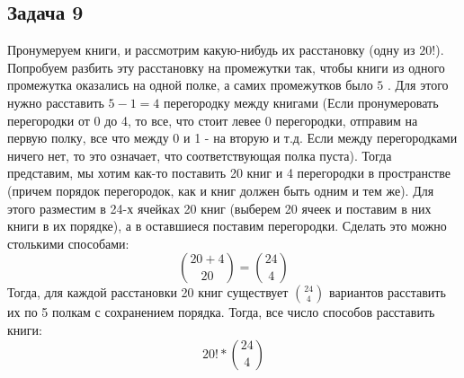 \documentclass{article}
\begin{document}
\begin{center}
	\subsection*{Задача 9}
\end{center}

Пронумеруем книги, и рассмотрим какую-нибудь их расстановку (одну из $20!$). Попробуем разбить эту расстановку на промежутки так, чтобы книги из одного промежутка оказались на одной полке, а самих промежутков было $5$ . Для этого нужно расставить $5 - 1 = 4$ перегородку между книгами  (Если пронумеровать перегородки от 0 до 4, то все, что стоит левее 0 перегородки, отправим на первую полку, все что между 0 и 1 - на вторую и т.д. Если между перегородками ничего нет, то это означает, что соответствующая полка пуста). Тогда представим, мы хотим как-то поставить 20 книг и 4 перегородки в пространстве (причем порядок перегородок, как и книг должен быть одним и тем же). Для этого разместим в 24-х ячейках 20 книг (выберем 20 ячеек и поставим в них книги в их порядке), а в оставшиеся поставим перегородки. Сделать это можно столькими способами: 
$$ {20 + 4 \choose 20} = {24 \choose 4}  $$
Тогда, для каждой расстановки 20 книг существует $ {24 \choose 4}  $ вариантов расставить их по 5 полкам с сохранением порядка. Тогда, все число способов расставить книги:
$$ 20! * {24 \choose 4}  $$
\end{document}
